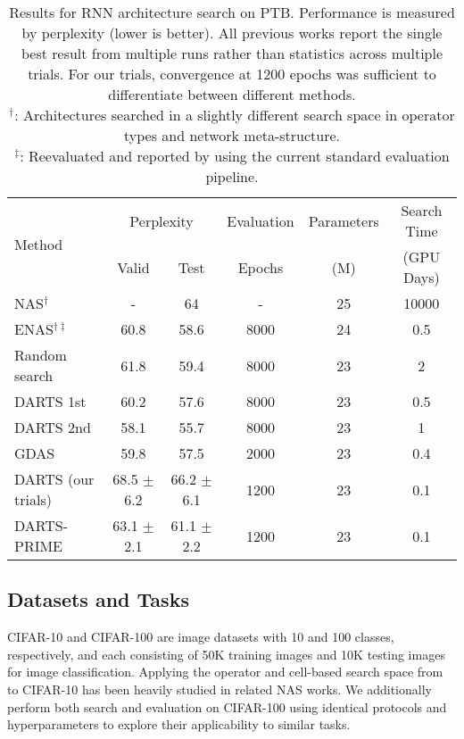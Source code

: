 \documentclass[letterpaper]{article} \usepackage{aaai22}  \usepackage{times}  \usepackage{helvet}  \usepackage{courier}  \usepackage[hyphens]{url}  \usepackage{graphicx} \urlstyle{rm} \def\UrlFont{\rm}  \usepackage{natbib}  \usepackage{caption} \DeclareCaptionStyle{ruled}{labelfont=normalfont,labelsep=colon,strut=off} \frenchspacing  \setlength{\pdfpagewidth}{8.5in}  \setlength{\pdfpageheight}{11in}  \usepackage{algorithm}
\begin{document}
\begin{table*}[ht]
\centering \small
\begin{tabular}{lccccc}
\toprule
\multirow{2}{*}{Method}  & \multicolumn{2}{c}{Perplexity} & Evaluation & Parameters  &  Search Time  \\
 &  Valid  &  Test  & Epochs & (M)  &  (GPU Days) \\  \midrule
NAS$^\dagger$ \cite{zoph2017neural} & - & 64 & - & 25 & 10000\\
ENAS$^{\dagger\ddagger}$ \cite{pham2018efficient} & 60.8 & 58.6 & 8000 & 24 & 0.5 
\\  \midrule
Random search \cite{liu2018darts}  & 61.8 & 59.4 & 8000 & 23 & 2 \\
DARTS 1st \cite{liu2018darts} & 60.2 & 57.6 & 8000 & 23 & 0.5 \\
DARTS 2nd \cite{liu2018darts} & 58.1 & 55.7 & 8000 & 23 & 1 \\ 
GDAS \cite{dong2019searching} & 59.8 & 57.5 & 2000 & 23 & 0.4 \\  \midrule 
DARTS (our trials) & 68.5 $\pm$ 6.2 & 66.2 $\pm$ 6.1 & 1200 & 23 & 0.1 \\
DARTS-PRIME &63.1 $\pm$ 2.1 & 61.1 $\pm$ 2.2 & 1200 & 23 & 0.1 \\
\bottomrule
\end{tabular}
\caption{Results for RNN architecture search on PTB. Performance is measured by perplexity (lower is better). All previous works report the single best result from multiple runs rather than statistics across multiple trials. For our trials, convergence at 1200 epochs was sufficient to differentiate between different methods. \\
$^\dagger$: Architectures searched in a slightly different search space in operator types and network meta-structure. \\
$^\ddagger$: Reevaluated and reported by \cite{liu2018darts} using the current standard evaluation pipeline.}
\label{table:rnn}
\end{table*}


\subsection{Datasets and Tasks}

CIFAR-10 and CIFAR-100 \cite{krizhevsky2009cifar} are image datasets with 10 and 100 classes, respectively, and each consisting of 50K training images and 10K testing images for image classification. Applying the operator and cell-based search space from \cite{liu2018darts} to CIFAR-10 has been heavily studied in related NAS works. We additionally perform both search and evaluation on CIFAR-100 using identical protocols and hyperparameters to explore their applicability to similar tasks.
\end{document}
